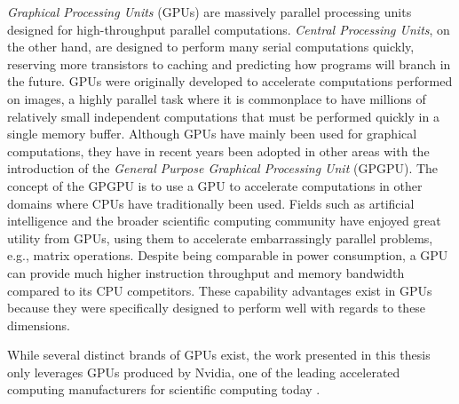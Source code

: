 \textit{Graphical Processing Units} (GPUs) are massively parallel processing units designed for high-throughput parallel computations.
\textit{Central Processing Units}, on the other hand, are designed to perform many serial computations quickly, reserving more transistors to caching and predicting how programs will branch in the future.
GPUs were originally developed to accelerate computations performed on images, a highly parallel task where it is commonplace to have millions of relatively small independent computations that must be performed quickly in a single memory buffer.
Although GPUs have mainly been used for graphical computations, they have in recent years been adopted in other areas with the introduction of the \textit{General Purpose Graphical Processing Unit} (GPGPU).
The concept of the GPGPU is to use a GPU to accelerate computations in other domains where CPUs have traditionally been used.
Fields such as artificial intelligence and the broader scientific computing community have enjoyed great utility from GPUs, using them to accelerate embarrassingly parallel problems, e.g., matrix operations.
Despite being comparable in power consumption, a GPU can provide much higher instruction throughput and memory bandwidth compared to its CPU competitors.
These capability advantages exist in GPUs because they were specifically designed to perform well with regards to these dimensions.

While several distinct brands of GPUs exist, the work presented in this thesis only leverages GPUs produced by Nvidia, one of the leading accelerated computing manufacturers for scientific computing today \cite{gpu_marketshare}.
